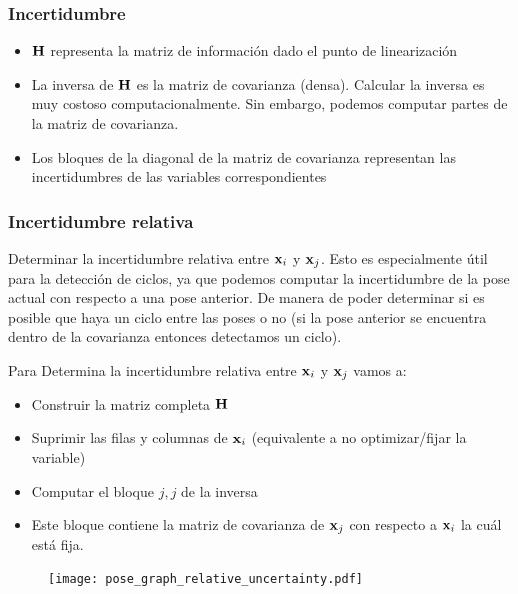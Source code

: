 \begin{frame}
    \frametitle{Incertidumbre}
    
    \begin{itemize}
        \item $\boldsymbol{\mathbf{H}}$ representa la matriz de información dado el punto de linearización
        \item La inversa de $\boldsymbol{\mathbf{H}}$ es la matriz de covarianza (densa). Calcular la inversa es muy costoso computacionalmente. Sin embargo, podemos computar partes de la matriz de covarianza.
        \item Los bloques de la diagonal de la matriz de covarianza representan las incertidumbres de las variables correspondientes
    \end{itemize}
\end{frame}

\begin{frame}
    \frametitle{Incertidumbre relativa}
    
    Determinar la incertidumbre relativa entre $\boldsymbol{\mathbf{x}}_{i}$ y $\boldsymbol{\mathbf{x}}_{j}$. Esto es especialmente útil para la detección de ciclos, ya que podemos computar la incertidumbre de la pose actual con respecto a una pose anterior. De manera de poder determinar si es posible que haya un ciclo entre las poses o no (si la pose anterior se encuentra dentro de la covarianza entonces detectamos un ciclo).
    
    Para Determina la incertidumbre relativa entre $\boldsymbol{\mathbf{x}}_{i}$ y $\boldsymbol{\mathbf{x}}_{j}$ vamos a:    
    \begin{itemize}
        \item Construir la matriz completa $\boldsymbol{\mathbf{H}}$
        \item Suprimir las filas y columnas de $\boldsymbol{\mathbf{x}}_{i}$ (equivalente a no optimizar/fijar la variable)
        \item Computar el bloque $j,j$ de la inversa
        \item Este bloque contiene la matriz de covarianza de $\boldsymbol{\mathbf{x}}_{j}$ con respecto a $\boldsymbol{\mathbf{x}}_{i}$ la cuál está fija.
    \end{itemize}

 	\begin{figure}[!h]
    \texttt{[image: pose\_graph\_relative\_uncertainty.pdf]}
    \end{figure}
    
\end{frame}


